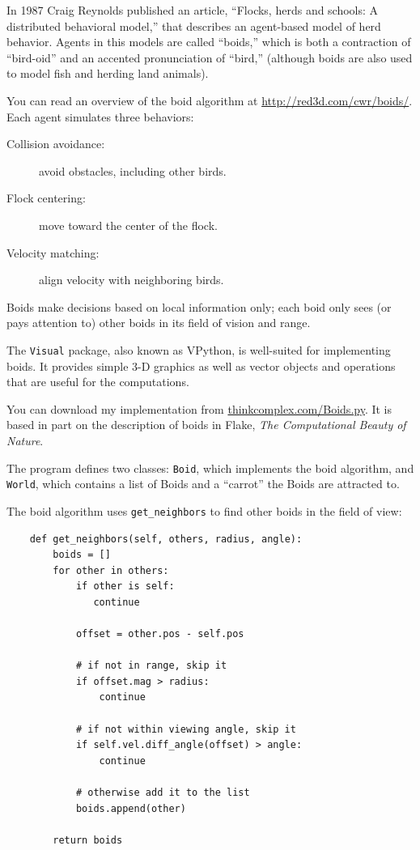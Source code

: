 \documentclass[10pt]{book}
\begin{document}
In 1987 Craig Reynolds published an article, ``Flocks, herds and
schools: A distributed behavioral model,'' that describes an
agent-based model of herd behavior.  Agents in this
models are called ``boids,'' which is both a contraction of
``bird-oid'' and an accented pronunciation of ``bird,'' (although
boids are also used to model fish and herding land animals).

You can read an overview of the boid algorithm at
\url{http://red3d.com/cwr/boids/}.  Each agent simulates three
behaviors:

\begin{description}

\item[Collision avoidance:] avoid obstacles, including other birds.

\item[Flock centering:] move toward the center of the flock.

\item[Velocity matching:] align velocity with neighboring birds.

\end{description}

Boids make decisions based on local information only; each boid
only sees (or pays attention to) other boids in its field of
vision and range.

The {\tt Visual} package, also known as VPython, is well-suited
for implementing boids.  It provides simple 3-D graphics as
well as vector objects and operations that are useful for the
computations.

You can download my implementation from
\url{thinkcomplex.com/Boids.py}.  It is based in part
on the description of boids in Flake, {\em The Computational
Beauty of Nature}.

The program defines two classes: {\tt Boid}, which implements the boid
algorithm, and {\tt World}, which contains a list of Boids and a
``carrot'' the Boids are attracted to.

The boid algorithm uses \verb"get_neighbors" to find other
boids in the field of view:

\begin{verbatim}
    def get_neighbors(self, others, radius, angle):
        boids = []
        for other in others:
            if other is self:
               continue

            offset = other.pos - self.pos
            
            # if not in range, skip it
            if offset.mag > radius:
                continue

            # if not within viewing angle, skip it
            if self.vel.diff_angle(offset) > angle:
                continue

            # otherwise add it to the list
            boids.append(other)
            
        return boids
\end{verbatim}
\end{document}
